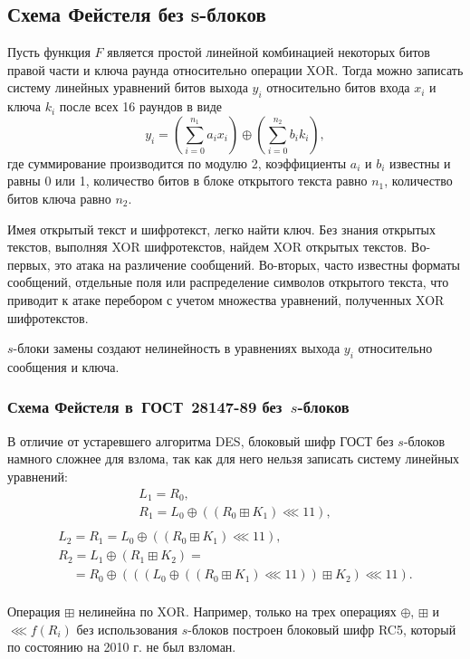 \subsection{Схема Фейстеля без s-блоков}

Пусть функция $F$ является простой линейной комбинацией некоторых битов правой части и ключа раунда относительно операции XOR. Тогда можно записать систему линейных уравнений битов выхода $y_i$ относительно битов входа $x_i$ и ключа $k_i$ после всех 16 раундов в виде
    \[ y_i = (\sum_{i=0}^{n_1} a_i x_i) \oplus (\sum_{i=0}^{n_2} b_i k_i), \]
где суммирование производится по модулю 2, коэффициенты $a_i$ и $b_i$ известны и равны 0 или 1, количество битов в блоке открытого текста равно $n_1$, количество битов ключа равно $n_2$.

Имея открытый текст и шифротекст, легко найти ключ. Без знания открытых текстов, выполняя XOR шифротекстов, найдем XOR открытых текстов. Во-первых, это атака на различение сообщений. Во-вторых, часто известны форматы сообщений, отдельные поля или распределение символов открытого текста, что приводит к атаке перебором с учетом множества уравнений, полученных XOR шифротекстов.

$s$-блоки замены создают нелинейность в уравнениях выхода $y_i$ относительно сообщения и ключа.


\subsubsection[Схема Фейстеля в ГОСТ 28147-89 без $s$-блоков]{Схема Фейстеля в~ГОСТ~28147-89 без~$s$-блоков}

В отличие от устаревшего алгоритма DES, блоковый шифр ГОСТ без $s$-блоков намного сложнее для взлома, так как для него нельзя записать систему линейных уравнений:
\[
    \begin{array}{l}
        L_1 = R_0, \\
        R_1 = L_0 \oplus ((R_0 \boxplus K_1) \lll 11), \\
    \end{array}
\] \[
    \begin{array}{l}
        L_2 = R_1 = L_0 \oplus ((R_0 \boxplus K_1) \lll 11), \\
        R_2 = L_1 \oplus (R_1 \boxplus K_2)  = \\
        ~~~~~= R_0 \oplus (((L_0 \oplus ((R_0 \boxplus K_1) \lll 11)) \boxplus K_2) \lll 11). \\
    \end{array}
\]

Операция $\boxplus$ нелинейна по XOR. Например, только на трех операциях $\oplus$, $\boxplus$ и $\lll f(R_i)$ без использования $s$-блоков построен блоковый шифр RC5, который по состоянию на 2010 г. не был взломан.
